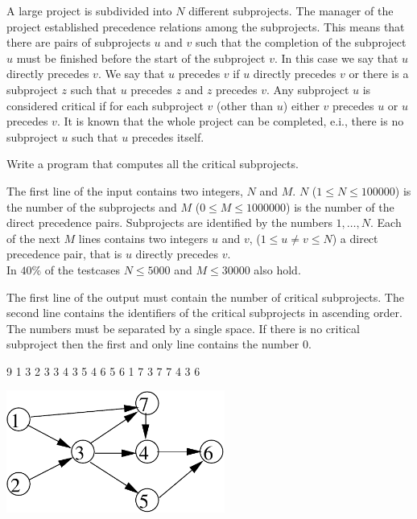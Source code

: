 

A large project is subdivided into $N$ different subprojects. The manager of the project established precedence relations among the subprojects. This means that there are pairs of subprojects $u$ and $v$ such that the completion of the subproject $u$ must be finished before the start of the subproject $v$. In this case we say that $u$ directly precedes $v$. We say that $u$ precedes $v$ if $u$ directly precedes $v$ or there is a subproject $z$ such that $u$ precedes $z$ and $z$ precedes $v$.
Any subproject $u$ is considered critical if for each subproject $v$ (other than $u$) either $v$ precedes $u$ or $u$ precedes $v$. It is known that the whole project can be completed, e.i., there is no subproject $u$ such that $u$ precedes itself.

Write a program that computes all the critical subprojects.

The first line of the input contains two integers, $N$ and $M$. $N$ ($1 \leq N \leq 100000$) is the number of the subprojects and $M$ ($0 \leq M \leq 1000000$) is the number of the direct precedence pairs. Subprojects are identified by the numbers $1, \ldots ,N$. Each of the next $M$ lines contains two integers $u$ and $v$, ($1 \leq u \neq v \leq N$) a direct precedence pair, that is $u$ directly precedes $v$.\\
\bigskip
In $40 \%$ of the testcases $N \leq 5000$ and $M \leq 30000$ also hold.

The first line of the output must contain the number of critical subprojects. The second line contains the identifiers of the critical subprojects in ascending order. The numbers must be separated by a single space. If there is no critical subproject then the first and only line contains the number 0.


 9
1 3
2 3
3 4
3 5
4 6
5 6
1 7
3 7
7 4
3 6
\sampleCOMMENT

\sampleEND

\includegraphics[height=4cm]{img/critical-fig.pdf}
\bigskip


